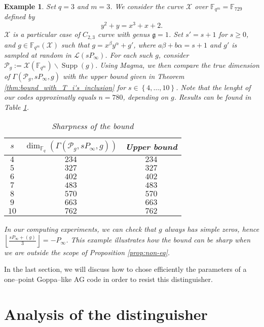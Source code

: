 \documentclass[a4paper]{article}
\newtheorem{expl}[thm]{Example}
\theoremstyle{definition}
\theoremstyle{remark}
\newcommand{\calP}{\mathcal{P}}
\newcommand{\calL}{\mathcal{L}}
\newcommand{\calX}{\mathcal{X}}
\newcommand{\fqm}{\mathbb{F}_{q^m}}
\newcommand{\fq}{\mathbb{F}_{q}}
\newcommand{\F}{\mathbb{F}}
\newcommand{\set}[1]{\left\{#1\right\}}
\newcommand{\Supp}{\operatorname{Supp}}
\begin{document}
\begin{expl}
Set $q=3$ and $m = 3$. We consider the curve $\calX$ over $\fqm = \F_{729}$ defined by $$ y^2+y = x^3+x+2.$$
$\calX$ is a particular case of $C_{2,3}$ curve with genus $\mathfrak{g}=1$. Set $s'=s+1$ for $s \geq 0$, and $g \in \fqm(\calX)$ such that $g=x^{\beta}y^{\alpha} + g'$, where $a\beta+b\alpha=s+1$ and $g'$ is sampled at random in $\calL(sP_\infty)$. For each such $g$, consider $\calP_g := \calX(\fqm) \backslash \Supp(g)$. Using Magma, we then compare the true dimension of $\Gamma(\calP_g,sP_\infty,g)$ with the upper bound given in Theorem \ref{thm:bound_with_T_i's_inclusion} for $s \in \set{4,\dots,10}$. Note that the lenght of our codes approximatly equals $n=780$, depending on $g$. Results can be found in \emph{Table \ref{table:expl_sharpness}}.
\begin{table}[h]
\begin{center}
\begin{tabular}{|c|c|c|}
    \hline
    $s$ & $\dim_{\fq}\left(\Gamma(\calP_g,sP_\infty,g)\right)$ & Upper bound \\
    \hline \hline
     $4$ & $234$ & $234$ \\
    \hline 
     $5$ & $327$ & $327$   \\
    \hline \hline
     $6$ & $402$ & $402$  \\
    \hline
     $7$ & $483$ & $483$  \\
    \hline \hline
     $8$ & $570$ & $570$   \\
    \hline
     $9$ & $663$ & $663$ \\
    \hline
     $10$  & $762$ & $762$ \\
    \hline
\end{tabular}
\caption{Sharpness of the bound} \label{table:expl_sharpness}
\end{center}
\end{table}


In our computing experiments, we can check that $g$ always has simple zeros, hence $\left\lfloor \frac{sP_\infty+(g)}{3} \right\rfloor =-P_\infty$. This example illustrates how the bound can be sharp when we are outside the scope of Proposition \ref{prop:non-eq}. 

\end{expl}

In the last section, we will discuss how to chose efficiently the parameters of a one--point Goppa--like AG code in order to resist this distinguisher.

\section{Analysis of the distinguisher}\label{sec:analysis}
\end{document}
